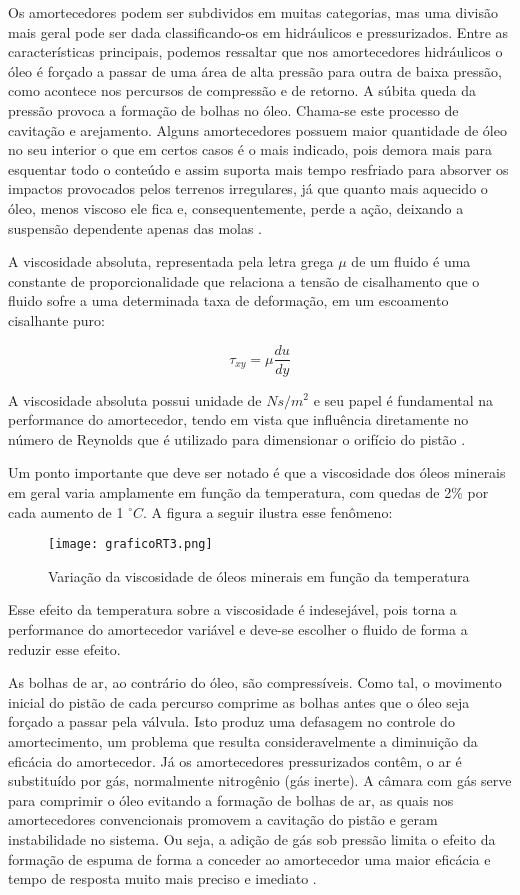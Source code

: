 			Os amortecedores podem ser subdividos em muitas categorias, mas uma divisão mais geral pode ser dada classificando-os em hidráulicos e pressurizados. Entre as características  principais,  podemos  ressaltar  que  nos  amortecedores hidráulicos o óleo é forçado a passar de uma área de alta pressão para outra de baixa  pressão, como acontece nos percursos de compressão e de retorno. A súbita queda da pressão provoca a formação de bolhas no óleo. Chama-se este processo de cavitação e arejamento. Alguns amortecedores possuem maior quantidade de óleo no seu interior o que em certos casos é o mais indicado, pois demora mais para esquentar todo o conteúdo e assim suporta mais tempo resfriado para absorver os impactos provocados pelos terrenos irregulares, já que quanto mais aquecido o óleo, menos viscoso ele fica e, consequentemente, perde a ação, deixando a suspensão dependente apenas das molas \cite{Offshox}.
			
			A viscosidade absoluta, representada pela letra grega $\mu$ de um fluido é uma constante de proporcionalidade que relaciona a tensão de cisalhamento que o fluido sofre a uma determinada taxa de deformação, em um escoamento cisalhante puro:

			$$\tau_{xy} = \mu \frac{du}{dy}$$

			A viscosidade absoluta possui unidade de $Ns/m^{2}$ e seu papel é fundamental na performance do amortecedor, tendo em vista que influência diretamente no número de Reynolds que é utilizado para dimensionar o orifício do pistão \cite{Dias}.
			
			Um ponto importante que deve ser notado é que a viscosidade dos óleos minerais em geral varia amplamente em função da temperatura, com quedas de 2\% por cada aumento de 1 $^{\circ}C$. A figura a seguir ilustra esse fenômeno:

			\begin{figure}[!h]
				\centering
				\texttt{[image: graficoRT3.png]}
				\caption[Variação da viscosidade de óleos minerais em função da temperatura]{Variação da viscosidade de óleos minerais em função da temperatura \cite{DOliveira}} 
				\label{graficoRT3}
			\end{figure}

			Esse efeito da temperatura sobre a viscosidade é indesejável, pois torna a performance do amortecedor variável e deve-se escolher o fluido de forma a reduzir esse efeito.
			
			As bolhas de ar, ao contrário do óleo, são compressíveis. Como tal, o movimento inicial do pistão de cada percurso comprime as bolhas antes que o óleo seja forçado a passar pela válvula.  Isto produz uma defasagem no controle do amortecimento, um problema que resulta consideravelmente a diminuição da eficácia do amortecedor. Já os amortecedores pressurizados contêm, o ar é substituído por gás, normalmente nitrogênio (gás inerte). A câmara com gás serve para comprimir o óleo evitando a formação de bolhas de ar, as quais nos amortecedores convencionais promovem a cavitação do pistão e geram instabilidade no sistema. Ou seja, a adição de gás sob pressão limita o efeito da formação de espuma de forma a conceder ao amortecedor uma maior eficácia e tempo de resposta muito mais preciso e imediato \cite{Pereira}.
			
